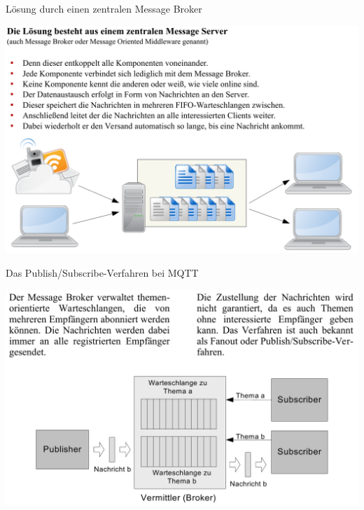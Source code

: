 \begin{frame}{Lösung durch einen zentralen Message Broker}
    \begin{center}
        \includegraphics[width=\linewidth]{06-architektur/img/mqtt5}
    \end{center}
\end{frame}

\begin{frame}{Das Publish/Subscribe-Verfahren bei MQTT}
    \begin{center}
        \includegraphics[width=\linewidth]{06-architektur/img/mqtt6}
    \end{center}
\end{frame}

